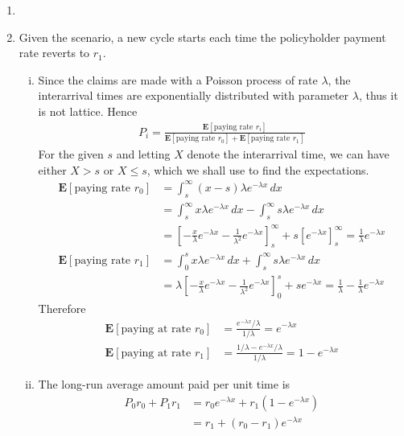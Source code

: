 \documentclass[a4paper,10pt]{article}
\theoremstyle{definition}
\begin{document}
\begin{enumerate}
\item
\item Given the scenario, a new cycle starts each time the policyholder payment rate reverts to $r_1$. 
\begin{enumerate}[(i)]
\item Since the claims are made with a Poisson process of rate $\lambda$, the interarrival times are exponentially distributed with parameter $\lambda$, thus it is not lattice. Hence
\begin{align*}
P_i=\frac{\mathbf{E}[\text{paying rate } r_i]}{\mathbf{E}[\text{paying rate } r_0]+\mathbf{E}[\text{paying rate } r_1]}
\end{align*}
For the given $s$ and letting $X$ denote the interarrival time, we can have either $X>s$ or $X \leq s$, which we shall use to find the expectations.
\begin{align*}
\mathbf{E}[\text{paying rate } r_0] &=\int_{s}^{\infty}(x-s)\lambda e^{-\lambda x}\,dx\\
&=\int_{s}^{\infty}x\lambda e^{-\lambda x}\,dx-\int_{s}^{\infty}s\lambda e^{-\lambda x}\,dx\\
&=\left[-\frac{x}{\lambda}e^{-\lambda x}-\frac{1}{\lambda^2}e^{-\lambda x}\right]_{s}^{\infty}+ s\left[e^{-\lambda x}\right]_{s}^{\infty}=\frac{1}{\lambda}e^{-\lambda x}\\
\mathbf{E}[\text{paying rate } r_1] &=\int_{0}^{s}x\lambda e^{-\lambda x}\,dx+\int_{s}^{\infty}s\lambda e^{-\lambda x}\,dx\\
&=\lambda\left[-\frac{x}{\lambda}e^{-\lambda x}-\frac{1}{\lambda^2}e^{-\lambda x}\right]_{0}^{s}+se^{-\lambda x}=\frac{1}{\lambda}-\frac{1}{\lambda}e^{-\lambda x}
\end{align*}
Therefore
\begin{align*}
\mathbf{E}[\text{paying at rate }r_0]&=\frac{e^{-\lambda x}/\lambda}{1/\lambda}=e^{-\lambda x} \\
\mathbf{E}[\text{paying at rate }r_1]&=\frac{1/\lambda -e^{-\lambda x}/\lambda}{1/\lambda} =1-e^{-\lambda x}
\end{align*}
\item The long-run average amount paid per unit time is 
\begin{align*}
P_0r_0+P_1r_1&=r_0e^{-\lambda x}+r_1(1-e^{-\lambda x})\\
&=r_1+(r_0-r_1)e^{-\lambda x}
\end{align*}
\end{enumerate}


\end{enumerate}
\end{document}
